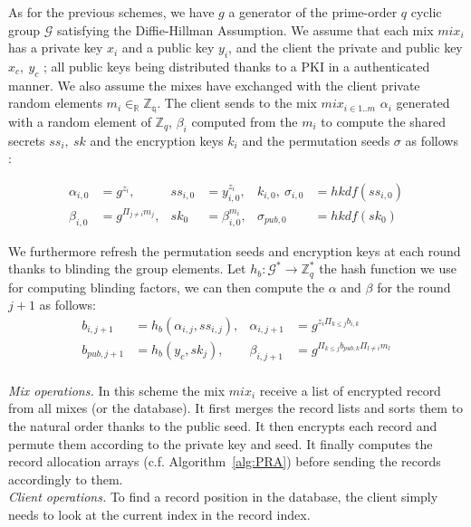 \documentclass[USenglish,oneside,twocolumn]{article}
\begin{document}
As for the previous schemes, we have $g$ a generator of the prime-order $q$ cyclic group $\mathcal{G}$ satisfying the Diffie-Hillman Assumption. We assume that each mix $mix_i$ has a private key $x_i$ and a public key $y_i$, and the client the private and public key $x_c,\ y_c$ ; all public keys being distributed thanks to a PKI in a authenticated manner.
We also assume the mixes have exchanged with the client private random elements $m_i \in_{\mathbb{R}} \mathbb{Z_q}$. 
The client sends to the mix $mix_{i\in 1..m}$ $\alpha_i$ generated with a random element of $\mathbb{Z}_q$, $\beta_i$ computed from the $m_i$ to compute the shared secrets $ss_i,\ sk$ and the encryption keys $k_i$ and the permutation seeds $\sigma$ as follows :
 
\begin{align*}
\alpha_{i,0} &= g^{z_i}, &ss_{i,0 }&= y_{i,0}^{z_i}, &k_{i,0},\ \sigma_{i,0}&=hkdf(ss_{i,0})\\
\beta_{i, 0} &= g^{\Pi_{j\neq i}m_j}, &sk_0 &= \beta_{i,0}^{m_i}, &\sigma_{pub, 0}&=hkdf( sk_0)
\end{align*}

We furthermore refresh the permutation seeds and encryption keys at each round thanks to blinding the group elements. Let $h_b : \mathcal{G}^* \rightarrow \mathbb{Z}_{q}^*$ the hash function we use for computing blinding factors, we can then compute the $\alpha$ and $\beta$ for the round $j+1$ as follows:
\begin{align*}
b_{i,j+1}&=h_b(\alpha_{i,j}, ss_{i,j}), & \alpha_{i,j+1} &= g^{z_i\Pi_{k\leq j}b_{i,k}}\\
b_{pub,j+1}&=h_b(y_c, sk_{j}), &\beta_{i, j+1} &= g^{\Pi_{k\leq j}b_{pub,k}\Pi_{l\neq i}m_l}\\
\end{align*}

\noindent\textit{Mix operations.} In this scheme the mix $mix_i$ receive a list of encrypted record from all mixes (or the database). It first merges the record lists and  sorts them to the natural order thanks to the public seed. It then encrypts each record and permute them according to the private key and seed. It finally computes the record allocation arrays (c.f. Algorithm~\ref{alg:PRA}) before sending the records accordingly to them.\\

\noindent\textit{Client operations.} To find a record position in the database, the client simply needs to look at the current index in the record index.\\
\end{document}
